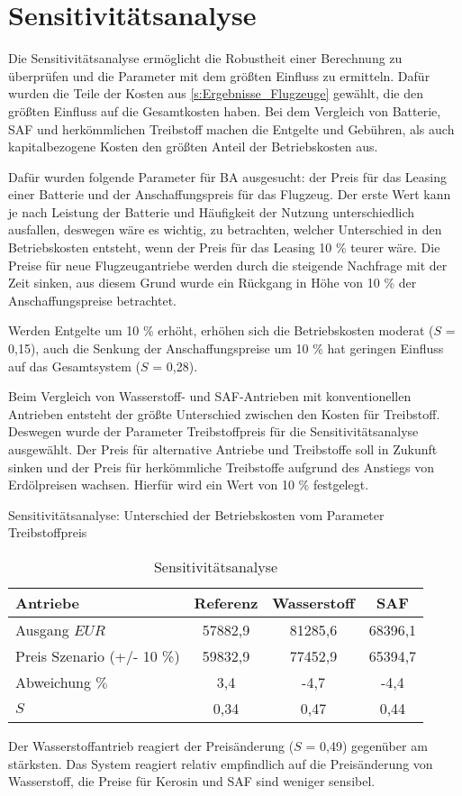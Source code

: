 \section{Sensitivitätsanalyse}
\label{s:Sensitivitätsanalyse}
%
Die Sensitivitätsanalyse ermöglicht die Robustheit einer Berechnung zu überprüfen 
und die Parameter mit dem größten Einfluss zu ermitteln. 
Dafür wurden die Teile der Kosten aus \ref{s:Ergebnisse_Flugzeuge} gewählt, 
die den größten Einfluss auf die Gesamtkosten haben. 
Bei dem Vergleich von Batterie, SAF und herkömmlichen Treibstoff 
machen die Entgelte und Gebühren, als auch kapitalbezogene Kosten den größten Anteil der Betriebskosten aus. %

Dafür wurden folgende Parameter für BA ausgesucht: der Preis für das Leasing einer Batterie 
und der Anschaffungspreis für das Flugzeug.
Der erste Wert kann je nach Leistung der Batterie und Häufigkeit der Nutzung unterschiedlich ausfallen, 
deswegen wäre es wichtig, zu betrachten, welcher Unterschied in den Betriebskosten entsteht, 
wenn der Preis für das Leasing 10 \% teurer wäre. 
Die Preise für neue Flugzeugantriebe werden durch die steigende Nachfrage mit der Zeit sinken, 
aus diesem Grund wurde ein Rückgang in Höhe von 10 \% der Anschaffungspreise betrachtet.

Werden Entgelte um 10 \% erhöht, erhöhen sich die Betriebskosten moderat ($S$ = 0,15), 
auch die Senkung der Anschaffungspreise um 10 \% hat geringen Einfluss auf das Gesamtsystem ($S$ = 0,28).

Beim Vergleich von Wasserstoff- und SAF-Antrieben mit konventionellen Antrieben 
entsteht der größte Unterschied zwischen den Kosten für Treibstoff. 
Deswegen wurde der Parameter \glqq Treibstoffpreis\grqq{} für die Sensitivitätsanalyse ausgewählt.
Der Preis für alternative Antriebe und Treibstoffe soll in Zukunft sinken und der Preis 
für herkömmliche Treibstoffe aufgrund des Anstiegs von Erdölpreisen wachsen. 
Hierfür wird ein Wert von 10 \% festgelegt.
%
\begin{table}[h]
	\begin{center}
    \caption{Sensitivitätsanalyse}{Sensitivitätsanalyse: Unterschied der Betriebskosten vom Parameter Treibstoffpreis}
	\label{sensiv}
	\begin{tabular}{|l|c|c|c|}
		\hline
		\textbf{Antriebe} & \textbf{Referenz}& \textbf{Wasserstoff}& \textbf{SAF} \\ \hline
		Ausgang $EUR$ & 57882,9 & 81285,6 & 68396,1	\\ \hline
        Preis Szenario (+/- 10 \%) & 59832,9 & 77452,9 & 65394,7\\ \hline
        Abweichung $\%$ & 3,4 & -4,7 & -4,4 \\ \hline
		$S$ & 0,34 & 0,47 & 0,44 \\ \hline
	\end{tabular}
    \end{center}
\end{table}
%
Der Wasserstoffantrieb reagiert der Preisänderung ($S$ = 0,49) gegenüber am stärksten. 
Das System reagiert relativ empfindlich auf die Preisänderung von Wasserstoff, 
die Preise für Kerosin und SAF sind weniger sensibel.
